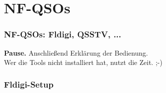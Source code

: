 \section{NF-QSOs}

\begin{frame}
    \frametitle{NF-QSOs: Fldigi, QSSTV, ...}

    \Large \textbf{Pause.}
    \normalsize Anschließend Erklärung der Bedienung. \\[2em]


    Wer die Tools nicht installiert hat, nutzt die Zeit. ;-)


\end{frame}

\begin{frame}
    \frametitle{Fldigi-Setup}

    \begin{center}
    \end{center}

\end{frame}

